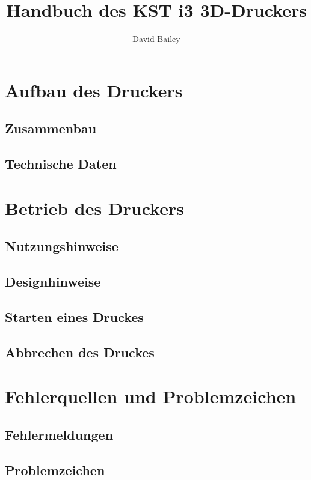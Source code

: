 \documentclass[11pt,a4paper]{article}
\title{Handbuch des KST i3 3D-Druckers}
\author{David Bailey}
\begin{document}
\maketitle
\newpage

\tableofcontents

\newpage
\section{Aufbau des Druckers}
\subsection{Zusammenbau}

\newpage
\subsection{Technische Daten}


\newpage
\section{Betrieb des Druckers}
\subsection{Nutzungshinweise}

\subsection{Designhinweise}

\subsection{Starten eines Druckes}
\subsection{Abbrechen des Druckes}

\newpage
\section{Fehlerquellen und Problemzeichen}
\subsection{Fehlermeldungen}

\subsection{Problemzeichen}

\end{document}
